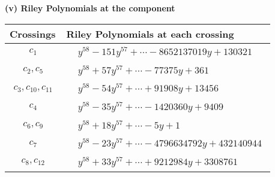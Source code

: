 \documentclass[1p]{elsarticle_modified}
\theoremstyle{definition}
\begin{document}
\flushleft \textbf{(v) Riley Polynomials at the component}\newline \\
\begin{tabular}{m{50pt}|m{274pt}}
Crossings & \hspace{64pt}Riley Polynomials at each crossing \\
\hline $$\begin{aligned}c_{1}\end{aligned}$$&$\begin{aligned}
&y^{58}-151 y^{57}+\cdots-8652137019 y+130321
\end{aligned}$\\
\hline $$\begin{aligned}c_{2},c_{5}\end{aligned}$$&$\begin{aligned}
&y^{58}+57 y^{57}+\cdots-77375 y+361
\end{aligned}$\\
\hline $$\begin{aligned}c_{3},c_{10},c_{11}\end{aligned}$$&$\begin{aligned}
&y^{58}-54 y^{57}+\cdots+91908 y+13456
\end{aligned}$\\
\hline $$\begin{aligned}c_{4}\end{aligned}$$&$\begin{aligned}
&y^{58}-35 y^{57}+\cdots-1420360 y+9409
\end{aligned}$\\
\hline $$\begin{aligned}c_{6},c_{9}\end{aligned}$$&$\begin{aligned}
&y^{58}+18 y^{57}+\cdots-5 y+1
\end{aligned}$\\
\hline $$\begin{aligned}c_{7}\end{aligned}$$&$\begin{aligned}
&y^{58}-23 y^{57}+\cdots-4796634792 y+432140944
\end{aligned}$\\
\hline $$\begin{aligned}c_{8},c_{12}\end{aligned}$$&$\begin{aligned}
&y^{58}+33 y^{57}+\cdots+9212984 y+3308761
\end{aligned}$\\
\hline
\end{tabular}\\~\\
\end{document}
